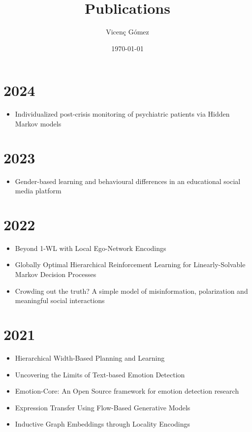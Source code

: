 \documentclass{article}
\title{Publications}
\author{Vicen\c{c} G\'omez}
\date{\today}
\begin{document}
\maketitle

\section*{2024}
\begin{itemize}
\item Individualized post-crisis monitoring of psychiatric patients via Hidden Markov models~\cite{garriga2024}
\end{itemize}


\section*{2023}
\begin{itemize}
\item Gender-based learning and behavioural differences in an educational social media platform~\cite{theophilou2023}

\end{itemize}

\section*{2022}

\begin{itemize}
\item Beyond 1-WL with Local Ego-Network Encodings~\cite{alvarez-gonzalez2022beyond}
\item Globally Optimal Hierarchical Reinforcement Learning for Linearly-Solvable Markov Decision Processes~\cite{infante2022globally}
\item Crowding out the truth? A simple model of misinformation, polarization and meaningful social interactions~\cite{fabrizio-ic2s2-2022}
\end{itemize}
\section*{2021}

\begin{itemize}
\item Hierarchical Width-Based Planning and Learning~\cite{junyent2021hierarchical}
\item Uncovering the Limits of Text-based Emotion Detection~\cite{nur21b}
\item Emotion-Core: An Open Source framework for emotion detection research~\cite{nur21c}
\item Expression Transfer Using Flow-Based Generative Models~\cite{Valenzuela_2021_CVPR}
\item Inductive Graph Embeddings through Locality Encodings~\cite{nur21a}
\end{itemize}
\end{document}
